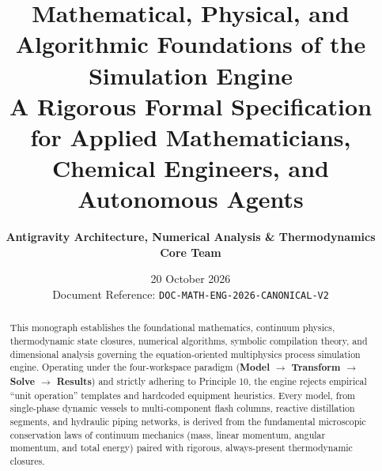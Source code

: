 \documentclass[11pt,a4paper]{article}
\title{\textbf{Mathematical, Physical, and Algorithmic Foundations of the Simulation Engine}\\[0.5em]
\Large A Rigorous Formal Specification for Applied Mathematicians, Chemical Engineers, and Autonomous Agents}
\author{\textbf{Antigravity Architecture, Numerical Analysis \& Thermodynamics Core Team}}
\date{20 October 2026 \\[0.5em] \small Document Reference: \texttt{DOC-MATH-ENG-2026-CANONICAL-V2}}
\begin{document}
\maketitle

\begin{abstract}
This monograph establishes the foundational mathematics, continuum physics, thermodynamic state closures, numerical algorithms, symbolic compilation theory, and dimensional analysis governing the equation-oriented multiphysics process simulation engine. Operating under the four-workspace paradigm (\textbf{Model $\to$ Transform $\to$ Solve $\to$ Results}) and strictly adhering to Principle 10, the engine rejects empirical ``unit operation'' templates and hardcoded equipment heuristics. Every model, from single-phase dynamic vessels to multi-component flash columns, reactive distillation segments, and hydraulic piping networks, is derived from the fundamental microscopic conservation laws of continuum mechanics (mass, linear momentum, angular momentum, and total energy) paired with rigorous, always-present thermodynamic closures.


\end{abstract}
\end{document}
